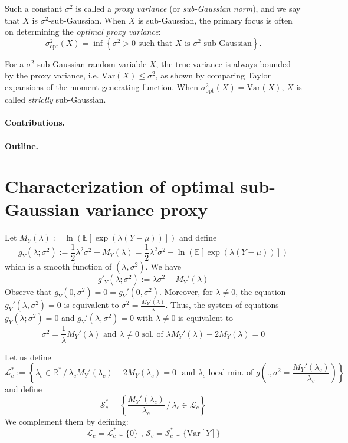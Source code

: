 \documentclass[a4paper, 10pt]{article}
\newcommand{\beq}{\begin{equation}}
\newcommand{\eeq}{\end{equation}}
\theoremstyle{definition}
\begin{document}
Such a constant \( \sigma^2 \) is called a \textit{proxy variance} (or \textit{sub-Gaussian norm}), and we say that \( X \) is \(\sigma^2\)-sub-Gaussian. When \( X \) is sub-Gaussian, the primary focus is often on determining the \textit{optimal proxy variance}:
\[
\sigma^2_{\mathrm{opt}}(X) = \inf \left\{ \sigma^2 > 0 \text{ such that } X \text{ is } \sigma^2\text{-sub-Gaussian} \right\}.
\]

For a \(\sigma^2\) sub-Gaussian random variable \(X\), the true variance is always bounded by the proxy variance, i.e. $\text{Var}(X) \leq \sigma^2$, as shown by comparing Taylor expansions of the moment-generating function. When $\sigma^2_{\mathrm{opt}}(X) = \mathrm{Var}(X)$, \(X\) is called \textit{strictly} sub-Gaussian.

\paragraph{Contributions.}

\paragraph{Outline.}

\section{Characterization of optimal sub-Gaussian variance proxy}\label{sec:charac}
Let $M_Y(\lambda):=\ln \left(\mathbb{E}[\exp(\lambda (Y - \mu))]\right)$ and define
\beq g_Y(\lambda;\sigma^2):=\frac{1}{2}\lambda^2\sigma^2- M_Y(\lambda)= \frac{1}{2}\lambda^2\sigma^2-\ln \left(\mathbb{E}[\exp(\lambda (Y - \mu))]\right)\eeq
which is a smooth function of $(\lambda,\sigma^2)$.
We have
\beq g'_Y(\lambda;\sigma^2):= \lambda\sigma^2- M_Y'(\lambda)\eeq
Observe that $g_Y(0,\sigma^2)=0=g_Y'(0,\sigma^2)$. Moreover, for $\lambda\neq 0$, the equation $g_Y'(\lambda,\sigma^2)=0$ is equivalent to $\sigma^2=\frac{M_Y'(\lambda)}{\lambda} $. Thus, the system of equations $g_Y(\lambda;\sigma^2)=0$ and $g_Y'(\lambda,\sigma^2)=0$ with $\lambda\neq 0$ is equivalent to  
\beq \sigma^2=\frac{1}{\lambda} M_Y'(\lambda) \text{ and } \lambda\neq 0 \text{ sol. of  } \lambda M_Y'(\lambda)- 2M_Y(\lambda)=0\eeq

Let us define
\beq \mathcal{L}_c^*:=\left\{\lambda_c \in \mathbb{R}^* \,/\,  \lambda_c M_Y'(\lambda_c)- 2M_Y(\lambda_c)=0 \,\, \text{ and }\lambda_c \text{ local min. of } g\left(.,\sigma^2=\frac{ M_Y'(\lambda_c)}{\lambda_c}\right) \right\}\eeq
and define 
\beq \mathcal{S}_c^*=\left\{\frac{M_Y'(\lambda_c)}{\lambda_c}  \,/\, \lambda_c\in \mathcal{L}_c\right\}\eeq
We complement them by defining:
\beq \mathcal{L}_c=\mathcal{L}_c^*\cup\{0\}\,\,, \,\mathcal{S}_c=\mathcal{S}_c^*\cup\{\text{Var}[Y]\}\eeq 
\end{document}

